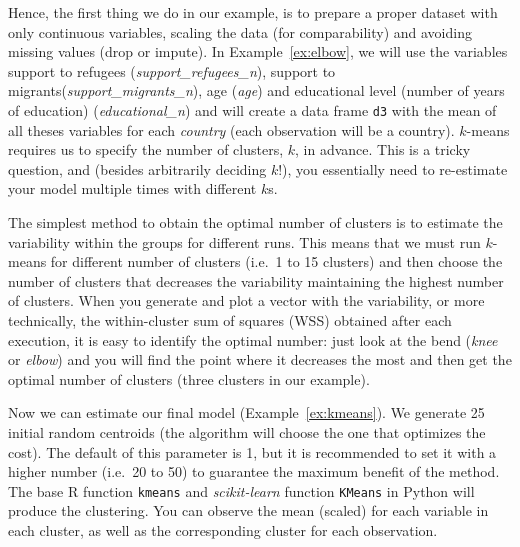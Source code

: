 Hence, the first thing we do in our example, is to prepare a proper
dataset with only continuous variables, scaling the data (for
comparability) and avoiding missing values (drop or impute). In
Example~\ref{ex:elbow}, we will use the variables support to refugees
(\emph{support\_refugees\_n}), support to
migrants(\emph{support\_migrants\_n}), age (\emph{age}) and
educational level (number of years of education)
(\emph{educational\_n}) and will create a data frame \verb+d3+ with the
mean of all theses variables for each \emph{country} (each observation
will be a country). $k$-means requires us to specify the number of
clusters, $k$, in advance. This is a tricky question, and (besides 
arbitrarily deciding $k$!), you essentially need to re-estimate your
model multiple times with different $k$s.

The simplest method to obtain the optimal number of clusters is to
estimate the variability within the groups for different runs. This
means that we must run $k$-means for different number of clusters
(i.e.\ 1 to 15 clusters) and then choose the number of clusters that
decreases the variability maintaining the highest number of
clusters. When you generate and plot a vector with the variability,
or more technically, the within-cluster sum of squares (WSS)
obtained after each execution, it is easy to identify the optimal
number: just look at the bend (\textit{knee} or \textit{elbow}) and
you will find the point where it decreases the most and then get the
optimal number of clusters (three clusters in our example).


Now we can estimate our final model (Example~\ref{ex:kmeans}). We generate 25
initial random centroids (the algorithm will choose the one that
optimizes the cost). The default of this parameter is 1, but it is
recommended to set it with a higher number (i.e.\ 20 to 50) to guarantee
the maximum benefit of the method. The base R function \texttt{kmeans} and
\emph{scikit-learn} function \texttt{KMeans} in Python will produce the
clustering. You can observe the mean (scaled) for each variable in
each cluster, as well as the corresponding cluster for each
observation.


